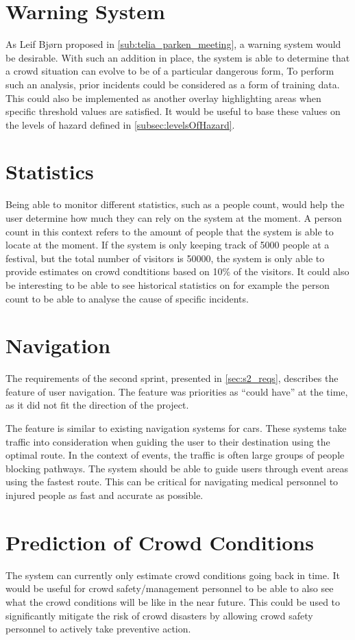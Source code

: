 \section{Warning System}
As Leif Bjørn proposed in \cref{sub:telia_parken_meeting}, a warning system would be desirable. With such an addition in place, the system is able to determine that a crowd situation can  evolve to be of a particular dangerous form, To perform such an analysis, prior incidents could be considered as a form of training data. This could also be implemented as another overlay highlighting areas when specific threshold values are satisfied. It would be useful to base these values on the levels of hazard defined in \cref{subsec:levelsOfHazard}.

\section{Statistics}
Being able to monitor different statistics, such as a people count, would help the user determine how much they can rely on the system at the moment. A person count in this context refers to the amount of people that the system is able to locate at the moment. If the system is only keeping track of 5000 people at a festival, but the total number of visitors is 50000, the system is only able to provide estimates on crowd condtitions based on 10\% of the visitors. It could also be interesting to be able to see historical statistics on for example the person count to be able to analyse the cause of specific incidents.

\section{Navigation}
The requirements of the second sprint, presented in \cref{sec:s2_reqs}, describes the feature of user navigation. The feature was priorities as \enquote{could have} at the time, as it did not fit the direction of the project.

The feature is similar to existing navigation systems for cars. These systems take traffic into consideration when guiding the user to their destination using the optimal route. In the context of events, the traffic is often large groups of people blocking pathways. The system should be able to guide users through event areas using the fastest route. This can be critical for navigating medical personnel to injured people as fast and accurate as possible.

\section{Prediction of Crowd Conditions}
The system can currently only estimate crowd conditions going back in time. It would be useful for crowd safety/management personnel to be able to also see what the crowd conditions will be like in the near future. This could be used to significantly mitigate the risk of crowd disasters by allowing crowd safety personnel to actively take preventive action.

